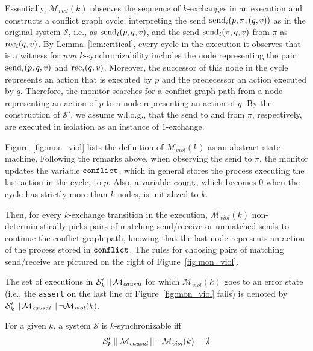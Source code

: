 Essentially, $\mathcal{M}_{\mathit{viol}}(k)$ observes the sequence of $k$-exchanges in an execution and constructs a conflict graph cycle, interpreting the send $\mathrm{send}_{i}({p,\pi,(q,v)})$ as in the original system $\mathcal{S}$, i.e., as $\mathrm{send}_{i}({p,q,v})$, and the send $\mathrm{send}_{i}({\pi,q,v})$ from $\pi$ as $\mathrm{rec}_{i}({q,v})$. By Lemma~\ref{lem:critical}, every cycle in the execution it observes that is a witness for \emph{non} $k$-synchronizability includes the node representing the pair $\mathrm{send}_{i}({p,q,v})$ and $\mathrm{rec}_{i}({q,v})$. Moreover, the successor of this node in the cycle represents an action that is executed by $p$ and the predecessor an action executed by $q$. Therefore, the monitor searches for a conflict-graph path from a node representing an action of $p$ to a node representing an action of $q$. By the construction of $\mathcal{S'}$, we assume w.l.o.g., that the send to and from $\pi$, respectively, are executed in isolation as an instance of $1$-exchange.

Figure~\ref{fig:mon_viol} lists the definition of $\mathcal{M}_{\mathit{viol}}(k)$ as an abstract state machine. Following the remarks above, when observing the send to $\pi$, the monitor updates the variable ${\tt conflict}$, which in general stores the process executing the last action in the cycle, to $p$. Also, a variable ${\tt count}$, which becomes $0$ when the cycle has strictly more than $k$ nodes, is initialized to $k$. 

Then, for every $k$-exchange transition in the execution, $\mathcal{M}_{\mathit{viol}}(k)$ non-deterministically picks pairs of matching send/receive or unmatched sends to continue the conflict-graph path, knowing that the last node represents an action of the process stored in ${\tt conflict}$. The rules for choosing pairs of matching send/receive are pictured on the right of Figure~\ref{fig:mon_viol}.

The set of executions in $\mathcal{S}_k' \,||\,\mathcal{M}_{\mathit{causal}}$ for which $\mathcal{M}_{\mathit{viol}}(k)$ goes to an error state (i.e., the {\tt assert} on the last line of Figure~\ref{fig:mon_viol} fails) is denoted by $\mathcal{S}_k' \,||\,\mathcal{M}_{\mathit{causal}}\,||\, \neg \mathcal{M}_{\mathit{viol}}(k)$.

\begin{theorem}
For a given $k$, a system $\mathcal{S}$ is $k$-synchronizable iff 
\begin{align*}
\mathcal{S}_k' \,||\,\mathcal{M}_{\mathit{causal}}\,||\, \neg \mathcal{M}_{\mathit{viol}}(k)=\emptyset
\end{align*}
\end{theorem}








